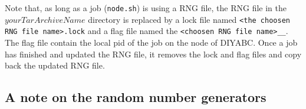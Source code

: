 Note that, as long as a job (\texttt{node.sh}) is using a RNG file, the RNG file in the $yourTarArchiveName$ directory is replaced by a lock file named \texttt{<the choosen RNG file name>.lock} and a flag file named the \texttt{<choosen RNG file name>\_<date of the run>\_<job id>}. The flag file contain the local pid of the job on the node of DIYABC. Once a job has finished and updated the RNG file, it removes the lock and flag files and copy back the updated RNG file.

\subsection{A note on the random number generators}\label{rng}



  


